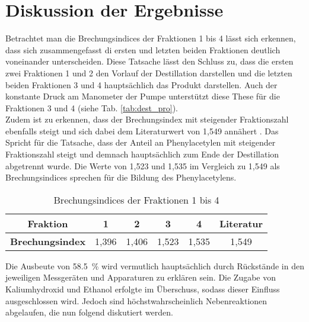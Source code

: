 \newpage
\section{Diskussion der Ergebnisse}
\label{sec:diskussion}
Betrachtet man die Brechungsindices der Fraktionen 1 bis 4 lässt sich erkennen, dass sich zusammengefasst di ersten und letzten beiden Fraktionen deutlich voneinander unterscheiden. Diese Tatsache lässt den Schluss zu, dass die ersten zwei Fraktionen 1 und 2 den Vorlauf der Destillation darstellen und die letzten beiden Fraktionen 3 und 4 hauptsächlich das Produkt darstellen. Auch der konstante Druck am Manometer der Pumpe unterstützt diese These für die Fraktionen 3 und 4 (siehe Tab. \ref{tab:dest_pro}).\\
Zudem ist zu erkennen, dass der Brechungsindex mit steigender Fraktionszahl ebenfalls steigt und sich dabei dem Literaturwert von 1,549 annähert \cite{phenylacetylen_chemspider}. Das Spricht für die Tatsache, dass der Anteil an Phenylacetylen mit steigender Fraktionszahl steigt und demnach hauptsächlich zum Ende der Destillation abgetrennt wurde. Die Werte von 1,523 und 1,535 im Vergleich zu 1,549 als Brechungsindices sprechen für die Bildung des Phenylacetylens.

\begin{table}[h!]
	\renewcommand*{\arraystretch}{1.2}
	\centering
	\caption{Brechungsindices der Fraktionen 1 bis 4}
	\label{tab:brechung_lit}
	\begin{tabulary}{1.0\textwidth}{C|CCCC|C}
		\hline
		\textbf{Fraktion} & \textbf{1} & \textbf{2}&\textbf{3}&\textbf{4}&Literatur \cite{phenylacetylen_chemspider}\\
		\hline
		\textbf{Brechungsindex}&1,396&1,406&1,523&1,535&1,549\\
		\hline			
	\end{tabulary}
\end{table}%
\FloatBarrier

Die Ausbeute von \SI{58,5}{\percent} wird vermutlich hauptsächlich durch Rückstände in den jeweiligen Messgeräten und Apparaturen zu erklären sein. Die Zugabe von Kaliumhydroxid und Ethanol erfolgte im Überschuss, sodass dieser Einfluss ausgeschlossen wird. Jedoch sind höchstwahrscheinlich Nebenreaktionen abgelaufen, die nun folgend diskutiert werden.\\

